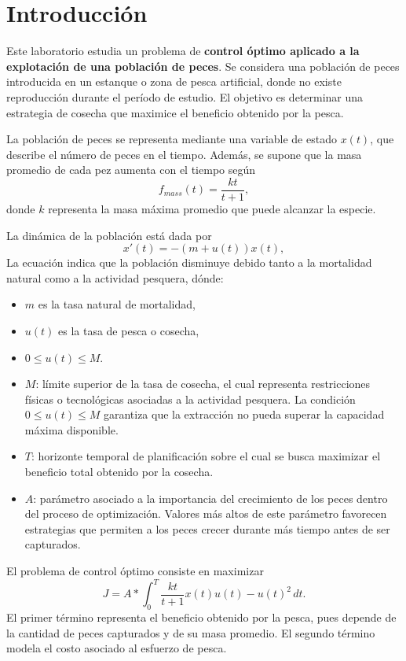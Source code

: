 \documentclass{uofa-eng-assignment}
\begin{document}
\maketitle
\section*{Introducción}

Este laboratorio estudia un problema de \textbf{control óptimo aplicado a la explotación de una población de peces}. Se considera una población de peces introducida en un estanque o zona de pesca artificial, donde no existe reproducción durante el período de estudio. El objetivo es determinar una estrategia de cosecha que maximice el beneficio obtenido por la pesca.

La población de peces se representa mediante una variable de estado $x(t)$, que describe el número de peces en el tiempo. Además, se supone que la masa promedio de cada pez aumenta con el tiempo según
\[
f_{mass}(t) = \frac{kt}{t + 1},
\]
donde $k$ representa la masa máxima promedio que puede alcanzar la especie.

La dinámica de la población está dada por
\[
x'(t) = -(m + u(t))x(t),
\]
La ecuación indica que la población disminuye debido tanto a la mortalidad natural como a la actividad pesquera, dónde: 
\begin{itemize}
    \item $m$ es la tasa natural de mortalidad,
    \item $u(t)$ es la tasa de pesca o cosecha,
    \item $0 \le u(t) \le M$.
    \item  \(M\): límite superior de la tasa de cosecha, el cual representa restricciones físicas o tecnológicas asociadas a la actividad pesquera. La condición \(0 \leq u(t) \leq M\) garantiza que la extracción no pueda superar la capacidad máxima disponible. 
    \item \(T\): horizonte temporal de planificación sobre el cual se busca maximizar el beneficio total obtenido por la cosecha. 
    \item \(A\): parámetro asociado a la importancia del crecimiento de los peces dentro del proceso de optimización. Valores más altos de este parámetro favorecen estrategias que permiten a los peces crecer durante más tiempo antes de ser capturados.
\end{itemize}
El problema de control óptimo consiste en maximizar
\[
J = A*\int_{0}^{T} \frac{kt}{t + 1}x(t)u(t) - u(t)^2 \, dt.
\]
El primer término representa el beneficio obtenido por la pesca, pues depende de la cantidad de peces capturados y de su masa promedio. El segundo término modela el costo asociado al esfuerzo de pesca. 
\end{document}
